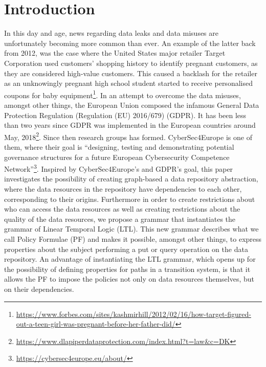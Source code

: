 \section{Introduction}
In this day and age, news regarding data leaks and data misuses are unfortunately becoming more common than ever. An example of the latter back from 2012, was the case where the United States major retailer Target Corporation used customers' shopping history to identify pregnant customers, as they are considered high-value customers. This caused a backlash for the retailer as an unknowingly pregnant high school student started to receive personalised coupons for baby equipment\footnote{\href{https://www.forbes.com/sites/kashmirhill/2012/02/16/how-target-figured-out-a-teen-girl-was-pregnant-before-her-father-did/}{https://www.forbes.com/sites/kashmirhill/2012/02/16/how-target-figured-out-a-teen-girl-was-pregnant-before-her-father-did/}}. In an attempt to overcome the data misuses, amongst other things, the European Union composed the infamous General Data Protection Regulation (Regulation (EU) 2016/679) (GDPR). It has been less than two years since GDPR was implemented in the European countries around May, 2018\footnote{\href{https://www.dlapiperdataprotection.com/index.html?t=law&c=DK}{https://www.dlapiperdataprotection.com/index.html?t=law\&c=DK}}. Since then research groups has formed. CyberSec4Europe is one of them, where their goal is ``designing, testing and demonstrating potential governance structures for a future European Cybersecurity Competence Network''\footnote{\href{https://cybersec4europe.eu/about/}{https://cybersec4europe.eu/about/}}. Inspired by CyberSec4Europe's and GDPR's goal, this paper investigates the possibility of creating graph-based a data repository abstraction, where the data resources in the repository have dependencies to each other, corresponding to their origins. Furthermore in order to create restrictions about who can access the data resources as well as creating restrictions about the quality of the data resources, we propose a grammar that instantiates the grammar of Linear Temporal Logic (LTL). This new grammar describes what we call Policy Formulae (PF) and makes it possible, amongst other things, to express properties about the subject performing a put or query operation on the data repository. An advantage of instantiating the LTL grammar, which opens up for the possibility of defining properties for paths in a transition system, is that it allows the PF to impose the policies not only on data resources themselves, but on their dependencies.

